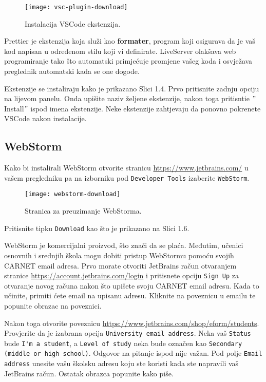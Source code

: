 \begin{figure}[h]
    \centering
    \texttt{[image: vsc-plugin-download]}
    \caption{Instalacija VSCode ekstenzija.}\label{fig:figure}
\end{figure}

Prettier je ekstenzija koja služi kao \textbf{formater}, program koji osigurava da je vaš kod napisan u određenom stilu koji vi definirate.
LiveServer olakšava web programiranje tako što automatski primjećuje promjene vašeg koda i osvježava preglednik automatski kada se one dogode.

Ekstenzije se instaliraju kako je prikazano Slici 1.4.
Prvo pritisnite zadnju opciju na lijevom panelu.
Onda upišite naziv željene ekstenzije, nakon toga pritisntie \("\)Install\("\) ispod imena ekstenzije.
Neke ekstenzije zahtjevaju da ponovno pokrenete VSCode nakon instalacije.

\subsection{WebStorm}\label{subsec:webstorm}

Kako bi instalirali WebStorm otvorite stranicu \href{https://www.jetbrains.com/}{https://www.jetbrains.com/} u vašem pregledniku pa na izborniku pod \verb|Developer Tools| izaberite \verb|WebStorm|.

\begin{wrapfigure}{r}{0.5\textwidth}
    \texttt{[image: webstorm-download]}
    \caption{Stranica za preuzimanje WebStorma.}
\end{wrapfigure}
Pritisnite tipku \verb|Download| kao što je prikazano na Slici 1.6.

WebStorm je komercijalni proizvod, što znači da se plaća.
Međutim, učenici osnovnih i srednjih škola mogu dobiti pristup WebStormu pomoću svojih CARNET email adresa.
Prvo morate otvoriti JetBrains račun otvaranjem stranice \href{https://account.jetbrains.com/login}{https://account.jetbrains.com/login} i pritisnete opciju \verb|Sign Up| za otvaranje novog računa nakon što upišete svoju CARNET email adresu.
Kada to učinite, primiti ćete email na upisanu adresu.
Kliknite na poveznicu u emailu te popunite obrazac na poveznici.

Nakon toga otvorite poveznicu \href{https://www.jetbrains.com/shop/eform/students}{https://www.jetbrains.com/shop/eform/students}.
Provjerite da je izabrana opcija \verb|University email address|.
Neka vaš \verb|Status| bude \verb|I'm a student|, a \verb|Level of study| neka bude označen kao \verb|Secondary (middle or high school)|.
Odgovor na pitanje ispod nije važan.
Pod polje \verb|Email address| unesite vašu školsku adresu koju ste koristi kada ste napravili vaš JetBrains račun.
Ostatak obrazca popunite kako piše.


